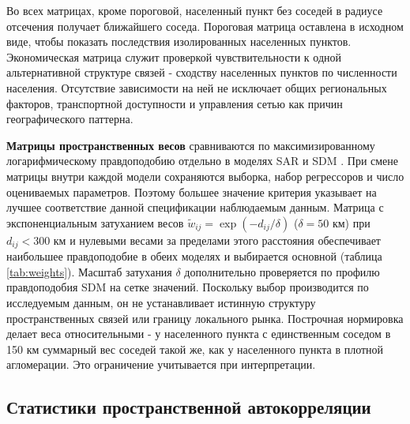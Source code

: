 \documentclass[12pt, a4paper]{article}
\begin{document}
Во всех матрицах, кроме пороговой, населенный пункт без соседей в радиусе отсечения получает ближайшего
соседа. Пороговая матрица оставлена в исходном виде, чтобы показать последствия изолированных
населенных пунктов. Экономическая матрица служит проверкой чувствительности к одной альтернативной структуре
связей - сходству населенных пунктов по численности населения. Отсутствие зависимости на ней не исключает
общих региональных факторов, транспортной доступности и управления сетью как причин
географического паттерна.

\textbf{Матрицы пространственных весов} сравниваются по максимизированному
логарифмическому правдоподобию отдельно в моделях SAR и SDM \cite{elhorst2014, lesage2009}.
При смене матрицы внутри каждой модели сохраняются выборка, набор регрессоров и число
оцениваемых параметров. Поэтому большее значение критерия указывает на лучшее соответствие
данной спецификации наблюдаемым данным. Матрица с экспоненциальным затуханием весов
$\tilde{w}_{ij} = \exp(-d_{ij}/\delta)$ ($\delta = 50$ км) при $d_{ij} < 300$ км и нулевыми
весами за пределами этого расстояния обеспечивает наибольшее правдоподобие в обеих моделях и
выбирается основной (таблица \ref{tab:weights}). Масштаб затухания $\delta$ дополнительно
проверяется по профилю правдоподобия SDM на сетке значений. Поскольку выбор производится по
исследуемым данным, он не устанавливает истинную структуру пространственных связей или границу
локального рынка. Построчная нормировка делает веса относительными - у населенного пункта с единственным
соседом в 150 км суммарный вес соседей такой же, как у населенного пункта в плотной агломерации. Это
ограничение учитывается при интерпретации.

\subsection*{Статистики пространственной автокорреляции}
\end{document}
